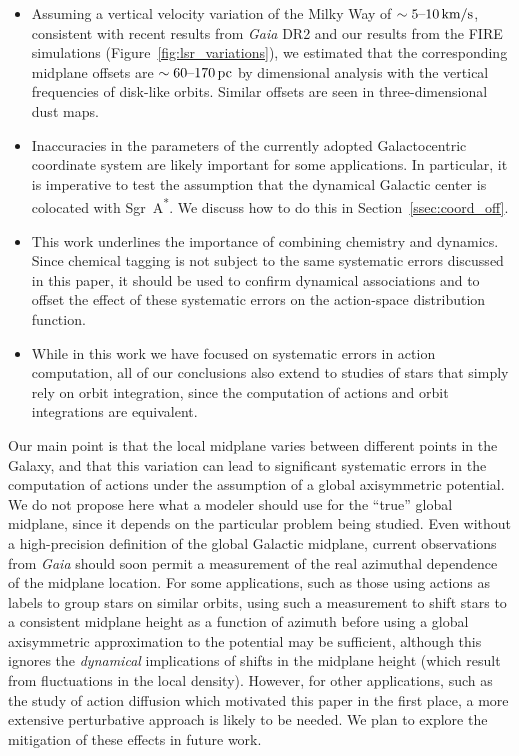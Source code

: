 \documentclass[twocolumn]{aastex62}
\newcommand{\pc}{\text{pc}}
\newcommand{\kms}{\text{km}/\text{s}}
\newcommand{\sgra}{Sgr~A\textsuperscript{*}}
\begin{document}
\begin{itemize}
\item Assuming a vertical velocity variation of the Milky Way of
$\sim5\textup{--}10\,\kms$, consistent with recent results from \textit{Gaia} DR2
\citep{2018A&A...616A..11G, 2019arXiv190209569F} and our results from the FIRE
simulations (Figure~\ref{fig:lsr_variations}), we estimated that the
corresponding midplane offsets are $\sim60\textup{--}170\,\pc$ by dimensional
analysis with the vertical frequencies of disk-like orbits. Similar offsets are seen in three-dimensional dust maps.

\item Inaccuracies in the parameters of the currently adopted
Galactocentric coordinate system are likely important for some
applications. In particular, it is imperative to test the assumption that the
dynamical Galactic center is colocated with \sgra{}. We discuss how to
do this in Section~\ref{ssec:coord_off}.

\item This work underlines the importance of combining chemistry and dynamics.
Since chemical tagging \citep{2002ARA&A..40..487F} is not subject to the same systematic errors discussed in this paper, it should be used to confirm dynamical associations and to offset the effect of these systematic errors on the action-space distribution function.

\item While in this work we have focused on systematic errors in action
computation, all of our conclusions also extend to studies of stars that
simply rely on orbit integration, since the computation of actions and orbit
integrations are equivalent.

\end{itemize}

Our main point is that the local midplane varies between different points in
the Galaxy, and that this variation can lead to significant systematic errors
in the computation of actions under the assumption of a global axisymmetric
potential. We do not propose here what a modeler should use for the ``true''
global midplane, since it depends on the particular problem being studied.
Even without a high-precision definition of the global Galactic midplane,
current observations from \textit{Gaia} should soon permit a measurement of the
real azimuthal dependence of the midplane location. For some applications,
such as those using actions as labels to group stars on similar orbits, using
such a measurement to shift stars to a consistent midplane height as a
function of azimuth before using a global axisymmetric approximation to the
potential may be sufficient, although this ignores the \emph{dynamical}
implications of shifts in the midplane height (which result from fluctuations
in the local density). However, for other applications, such as the study of
action diffusion which motivated this paper in the first place, a more
extensive perturbative approach is likely to be needed. We plan to explore the
mitigation of these effects in future work.
\end{document}
